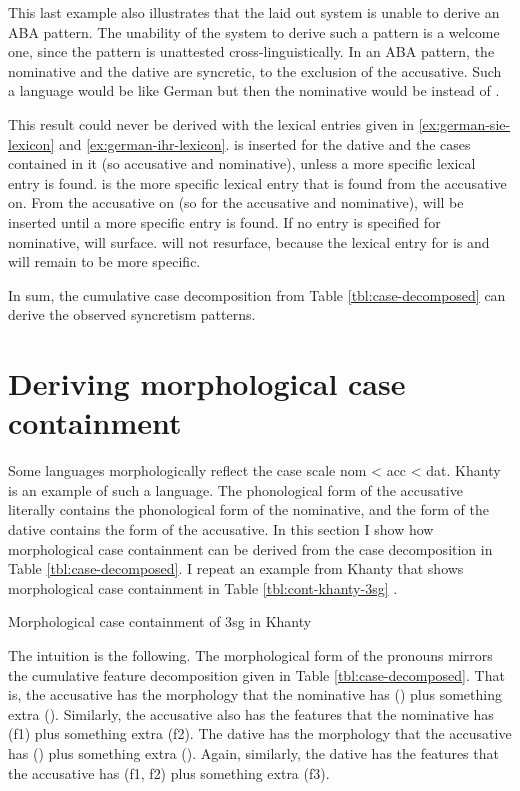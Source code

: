 This last example also illustrates that the laid out system is unable to derive an ABA pattern. The unability of the system to derive such a pattern is a welcome one, since the pattern is unattested cross-linguistically. In an ABA pattern, the nominative and the dative are syncretic, to the exclusion of the accusative. Such a language would be like German but then the nominative would be  instead of .

This result could never be derived with the lexical entries given in \ref{ex:german-sie-lexicon} and \ref{ex:german-ihr-lexicon}.  is inserted for the dative and the cases contained in it (so accusative and nominative), unless a more specific lexical entry is found.  is the more specific lexical entry that is found from the accusative on. From the accusative on (so for the accusative and nominative),  will be inserted until a more specific entry is found. If no entry is specified for nominative,  will surface.  will not resurface, because the lexical entry for  is and will remain to be more specific.

In sum, the cumulative case decomposition from Table \ref{tbl:case-decomposed} can derive the observed syncretism patterns.

\section{Deriving morphological case containment}

Some languages morphologically reflect the case scale \ac{nom} < \ac{acc} < \ac{dat}. Khanty is an example of such a language. The phonological form of the accusative literally contains the phonological form of the nominative, and the form of the dative contains the form of the accusative. In this section I show how morphological case containment can be derived from the case decomposition in Table \ref{tbl:case-decomposed}. I repeat an example from Khanty that shows morphological case containment in Table \ref{tbl:cont-khanty-3sg} .

\begin{table}[H]
  \center
  \caption {Morphological case containment of 3\ac{sg} in Khanty}
    
  \label{tbl:cont-khanty-3sg}
\end{table}

The intuition is the following. The morphological form of the pronouns mirrors the cumulative feature decomposition given in Table \ref{tbl:case-decomposed}. That is, the accusative has the morphology that the nominative has () plus something extra (). Similarly, the accusative also has the features that the nominative has (\ac{f}1) plus something extra (\ac{f}2). The dative has the morphology that the accusative has () plus something extra (). Again, similarly, the dative has the features that the accusative has (\ac{f}1, \ac{f}2) plus something extra (\ac{f}3).

